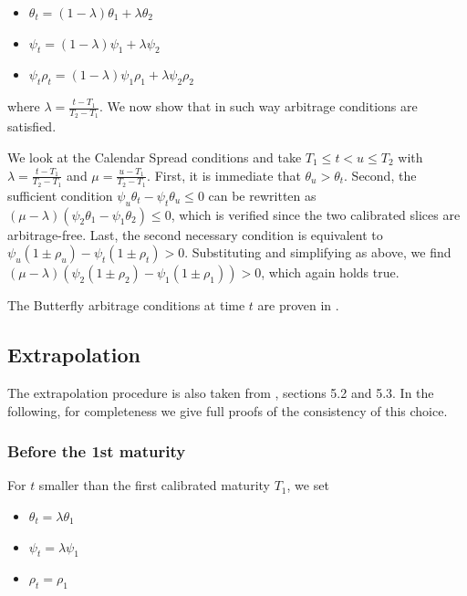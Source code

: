 \documentclass{article}
\providecommand{\tightlist}{%
      \setlength{\itemsep}{0pt}\setlength{\parskip}{0pt}}
\begin{document}
\begin{itemize}
\tightlist
\item
  \(\theta_{t} = (1-\lambda)\theta_1 + \lambda\theta_2\)
\item
  \(\psi_{t} = (1-\lambda)\psi_1 + \lambda\psi_2\)
\item
  \(\psi_{t}\rho_t = (1-\lambda)\psi_1\rho_1 + \lambda\psi_2\rho_2\)
\end{itemize}

where \(\lambda = \frac{t-T_1}{T_2-T_1}\). We now show that in such way
arbitrage conditions are satisfied.

	We look at the Calendar Spread conditions and take
\(T_1\leq t<u\leq T_2\) with \(\lambda = \frac{t-T_1}{T_2-T_1}\) and
\(\mu = \frac{u-T_1}{T_2-T_1}\). First, it is immediate that
\(\theta_u>\theta_t\). Second, the sufficient condition
\(\psi_u\theta_t-\psi_t\theta_u\leq0\) can be rewritten as
\((\mu-\lambda)(\psi_2\theta_1-\psi_1\theta_2)\leq0\), which is verified
since the two calibrated slices are arbitrage-free. Last, the second
necessary condition is equivalent to
\(\psi_u(1\pm\rho_u)-\psi_t(1\pm\rho_t)>0\). Substituting and
simplifying as above, we find
\((\mu-\lambda)(\psi_2(1\pm\rho_2)-\psi_1(1\pm\rho_1))>0\), which again
holds true.

	The Butterfly arbitrage conditions at time \(t\) are proven in
\cite{corbetta2019robust}.

	\hypertarget{extrapolation}{%
\subsection{Extrapolation}\label{extrapolation}}

	The extrapolation procedure is also taken from
\cite{corbetta2019robust}, sections 5.2 and 5.3. In the following, for
completeness we give full proofs of the consistency of this choice.

	\hypertarget{before-the-1st-maturity}{%
\subsubsection{Before the 1st maturity}\label{before-the-1st-maturity}}

	For \(t\) smaller than the first calibrated maturity \(T_1\), we set

\begin{itemize}
\tightlist
\item
  \(\theta_t = \lambda\theta_1\)
\item
  \(\psi_t = \lambda\psi_1\)
\item
  \(\rho_t = \rho_1\)
\end{itemize}
\end{document}

